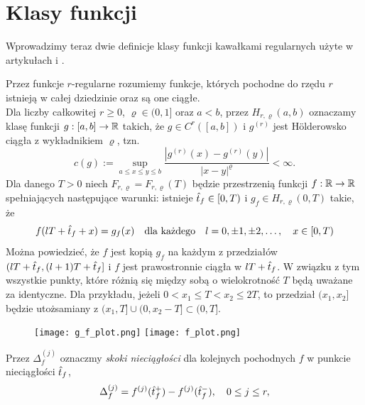 \documentclass[oik, pdftex, man]{mgrwms}
\begin{document}
\section{Klasy funkcji} \label{rozdzial:klasy_funkcji}

    Wprowadzimy teraz dwie definicje klasy funkcji kawałkami regularnych użyte w artykułach \cite{CoDF} i \cite{AoP}. 

    Przez funkcje $r$-regularne rozumiemy funkcje, których pochodne do rzędu $r$ istnieją w całej dziedzinie oraz są one ciągłe. \\
    Dla liczby całkowitej $ r \geq 0$, $\varrho \in (0,1]$ oraz $a < b$, przez $H_{r, \varrho}(a,b)$ oznaczamy klasę funkcji $g: [a,b] \rightarrow \mathbb{R}$ takich, że $g \in C^r([a, b])$ i $g^{(r)}$ jest Hölderowsko ciągła z wykładnikiem $\varrho$, tzn.
    \begin{equation*}
        c(g) := \sup_{a \leq x \leq y \leq b} \frac{|g^{(r)}(x) - g^{(r)}(y)|}{|x-y|^{\varrho}} < \infty.
    \end{equation*}
    Dla danego $T > 0$ niech $F_{r, \varrho} = F_{r, \varrho}(T)$ będzie przestrzenią funkcji $f: \mathbb{R} \rightarrow \mathbb{R}$ spełniających następujące warunki: istnieje $\hat{t}_{f} \in [0, T)$ i $g_f \in H_{r, \varrho}(0,T)$ takie, że
    \begin{equation*}
        f(lT + \hat{t}_f + x) = g_f(x) \quad \text{dla każdego} \quad l = 0, \pm 1, \pm 2, \ldots, \quad x \in [0, T)
    \end{equation*}
    Można powiedzieć, że $f$ jest kopią $g_f$ na każdym z przedziałów $(lT + \hat{t}_f, (l + 1)T + \hat{t}_f]$ i $f$ jest prawostronnie ciągła w $lT + \hat{t}_f$. W związku z tym wszystkie punkty, które różnią się między sobą o wielokrotność $T$ będą uważane za identyczne. Dla przykładu, jeżeli $0 < x_1 \leq T < x_2 \leq 2T$, to przedział $(x_1, x_2]$ będzie utożsamiany z $(x_1,T] \cup (0, x_2 - T] \subset (0, T]$.

    \begin{figure}[h!]
        \texttt{[image: g\_f\_plot.png]}
        \texttt{[image: f\_plot.png]}
    \end{figure}

    Przez $\Delta_f^{(j)}$ oznaczmy \emph{skoki nieciągłości} dla kolejnych pochodnych $f$ w punkcie nieciągłości $\hat{t}_f$,
    \begin{equation*}
        \Delta_f^{(j)} = f^{(j)}(\hat{t}_f^+) - f^{(j)}(\hat{t}_f^-), \quad 0 \leq j \leq r,
    \end{equation*}
\end{document}
